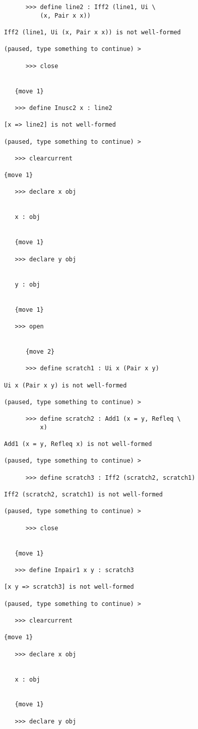 \documentclass[12pt]{article}
\begin{document}
\begin{verbatim}
      >>> define line2 : Iff2 (line1, Ui \
          (x, Pair x x))

Iff2 (line1, Ui (x, Pair x x)) is not well-formed

(paused, type something to continue) >

      >>> close


   {move 1}

   >>> define Inusc2 x : line2

[x => line2] is not well-formed

(paused, type something to continue) >

   >>> clearcurrent

{move 1}

   >>> declare x obj


   x : obj


   {move 1}

   >>> declare y obj


   y : obj


   {move 1}

   >>> open


      {move 2}

      >>> define scratch1 : Ui x (Pair x y)

Ui x (Pair x y) is not well-formed

(paused, type something to continue) >

      >>> define scratch2 : Add1 (x = y, Refleq \
          x)

Add1 (x = y, Refleq x) is not well-formed

(paused, type something to continue) >

      >>> define scratch3 : Iff2 (scratch2, scratch1)

Iff2 (scratch2, scratch1) is not well-formed

(paused, type something to continue) >

      >>> close


   {move 1}

   >>> define Inpair1 x y : scratch3

[x y => scratch3] is not well-formed

(paused, type something to continue) >

   >>> clearcurrent

{move 1}

   >>> declare x obj


   x : obj


   {move 1}

   >>> declare y obj



\end{verbatim}
\end{document}
